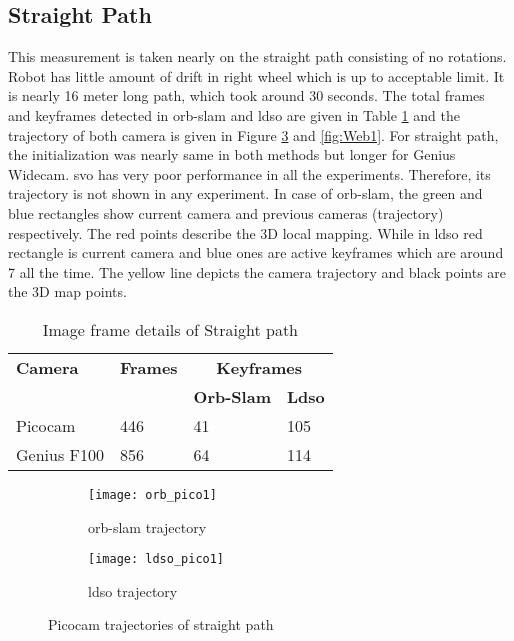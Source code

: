 \subsection{Straight Path}
This measurement is taken nearly on the straight path consisting of no rotations. Robot has little amount of drift in right wheel which is up to acceptable limit. It is nearly 16 meter long path, which took around 30 seconds. The total frames and keyframes detected in \acrshort{orb}-\acrshort{slam} and \acrshort{ldso} are given in Table \ref{table:straight} and the trajectory of both camera is given in Figure \ref{fig:Pico1} and \ref{fig:Web1}. For straight path, the initialization was nearly same in both methods but longer for Genius Widecam. \acrshort{svo} has very poor performance in all the experiments. Therefore, its trajectory is not shown in any experiment. In case of \acrshort{orb}-\acrshort{slam}, the green and blue rectangles show current camera and previous cameras (trajectory) respectively. The red points describe the 3D local mapping. While in \acrshort{ldso} red rectangle is current camera and blue ones are active keyframes which are around 7 all the time. The yellow line depicts the camera trajectory and black points are the 3D map points.\\
\begin{table}[H]
	\centering
	\renewcommand{\arraystretch}{1.5}
	\begin{tabular}{ l| l| l |l }
		\textbf{Camera} & \textbf{Frames} & \multicolumn{2}{c}{\textbf{Keyframes}}  \\    
		&      & \textbf{Orb-Slam}  & \textbf{Ldso}  \\
		\hline
		Picocam & 446 &  41  & 105 \\ 
		\hline
		Genius F100 & 856 &  64  & 114 \\ 
	\end{tabular}
	\caption{Image frame details of Straight path}
	\label{table:straight}
\end{table}
\begin{figure}[H]
	\begin{subfigure}{.5\textwidth}
		\centering
		\texttt{[image: orb\_pico1]}
		\caption{\acrshort{orb}-\acrshort{slam} trajectory}
		\label{fig:orb_pico1}
	\end{subfigure}%
	\begin{subfigure}{.5\textwidth}
		\centering
		\texttt{[image: ldso\_pico1]}
		\caption{\acrshort{ldso} trajectory}
		\label{fig:ldso_pico1}
	\end{subfigure}
	\caption{Picocam trajectories of straight path}
	\label{fig:Pico1}
\end{figure}
